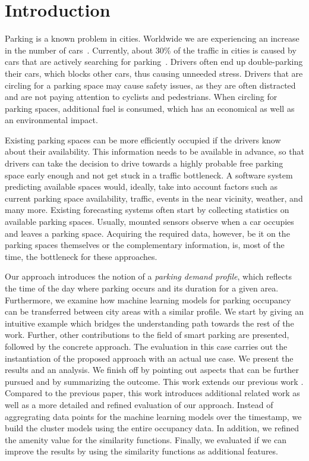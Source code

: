 \section{Introduction}
Parking is a known problem in cities.
Worldwide we are experiencing an increase in the number of cars~\cite{car_increase}.
Currently, about 30\% of the traffic in cities is caused by cars that are actively searching for parking~\cite{traffic_congestion}.
Drivers often end up double-parking their cars, which blocks other cars, thus causing unneeded stress.
Drivers that are circling for a parking space may cause safety issues, as they are often distracted and are not paying attention to cyclists and pedestrians.
When circling for parking spaces, additional fuel is consumed, which has an economical as well as an environmental impact.

Existing parking spaces can be more efficiently occupied if the drivers know about their availability.
This information needs to be available in advance, so that drivers can take the decision to drive towards a highly probable free parking space early enough and not get stuck in a traffic bottleneck.
A software system predicting available spaces would, ideally, take into account factors such as current parking space availability, traffic, events in the near vicinity, weather, and many more.
Existing forecasting systems often start by collecting statistics on available parking spaces.
Usually, mounted sensors observe when a car occupies and leaves a parking space.
Acquiring the required data, however, be it on the parking spaces themselves or the complementary information, is, most of the time, the bottleneck for these approaches. 

Our approach introduces the notion of a \textit{parking demand profile}, which reflects the time of the day where parking occurs and its duration for a given area.
Furthermore, we examine how machine learning models for parking occupancy can be transferred between city areas with a similar profile.
We start by giving an intuitive example which bridges the understanding path towards the rest of the work.
Further, other contributions to the field of smart parking are presented, followed by the concrete approach.
The evaluation in this case carries out the instantiation of the proposed approach with an actual use case. We present the results and an analysis.
We finish off by pointing out aspects that can be further pursued and by summarizing the outcome.
This work extends our previous work \cite{ionita2018park}. Compared to the previous paper, this work introduces additional related work as well as a more detailed and refined evaluation of our approach.
Instead of aggregrating data points for the machine learning models over the timestamp, we build the cluster models using the entire occupancy data. 
In addition, we refined the amenity value for the similarity functions. Finally, we evaluated if we can improve the results by using the similarity functions as additional features. 

